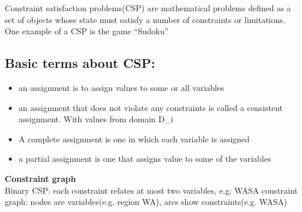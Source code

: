 Constraint satisfaction problems(CSP) are mathematical problems defined as a set of objects whose state must satisfy a number of constraints or limitations. One example of a CSP is the game “Sudoku” \\[3ex]

\subsection{Basic terms about CSP:}
\begin{itemize}
\item an assignment is to assign values to some or all variables
\item an assignment that does not violate any constraints is called a consistent assignment. With values from domain D\_i
\item A complete assignment is one in which each variable is assigned
\item a partial assignment is one that assigns value to some of the variables 
\end{itemize}


\textbf{Constraint graph}\\
Binary CSP: each constraint relates at most two variables, e.g: WASA
constraint graph: nodes are variables(e.g. region WA), arcs show constraints(e.g. WASA)\\[3ex]

